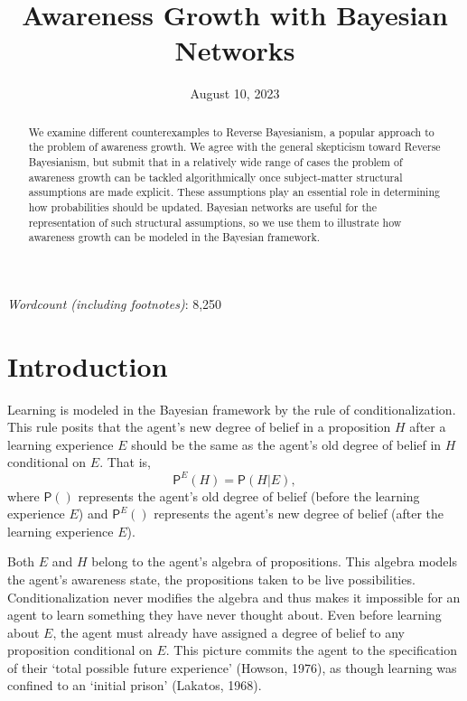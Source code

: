 \documentclass[
  11pt,
  dvipsnames,enabledeprecatedfontcommands, todos]{scrartcl}
\title{Awareness Growth with Bayesian Networks}
\author{}
\date{\vspace{-2.5em}August 10, 2023}
\newcommand{\pr}[1]{\ensuremath{\mathsf{P}(#1)}}
\newcommand{\ppr}[2]{\ensuremath{\mathsf{P}^{#1}(#2)}}
\begin{document}
\maketitle

\doublespace

\emph{Wordcount (including footnotes)}: 8,250

\begin{abstract}
We examine different counterexamples to Reverse Bayesianism, a popular approach to the problem of awareness growth. We agree with the general skepticism toward Reverse Bayesianism, but submit that in a relatively wide range of cases the problem of awareness growth  can be tackled algorithmically once subject-matter structural assumptions are made explicit. These assumptions play an essential role in determining how probabilities should be updated. Bayesian networks are useful for the representation of such structural assumptions, so we use them to illustrate how awareness growth can be modeled in the Bayesian framework. 
\end{abstract}

\doublespace

\hypertarget{introduction}{%
\section{Introduction}\label{introduction}}

Learning is modeled in the Bayesian framework by the rule of
conditionalization. This rule posits that the agent's new degree of
belief in a proposition \(H\) after a learning experience \(E\) should
be the same as the agent's old degree of belief in \(H\) conditional on
\(E\). That is, \[\ppr{E}{H}=\pr{H \vert E},\] where \(\pr{}\)
represents the agent's old degree of belief (before the learning
experience \(E\)) and \(\ppr{E}{}\) represents the agent's new degree of
belief (after the learning experience \(E\)).

Both \(E\) and \(H\) belong to the agent's algebra of propositions. This
algebra models the agent's awareness state, the propositions taken to be
live possibilities. Conditionalization never modifies the algebra and
thus makes it impossible for an agent to learn something they have never
thought about. Even before learning about \(E\), the agent must already
have assigned a degree of belief to any proposition conditional on
\(E\). This picture commits the agent to the specification of their
`total possible future experience' (Howson, 1976), as though learning
was confined to an `initial prison' (Lakatos, 1968).
\end{document}
